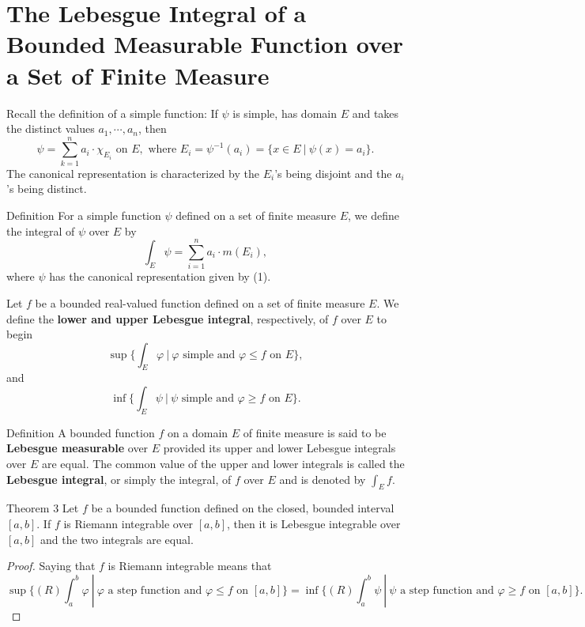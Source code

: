 \section{The Lebesgue Integral of a Bounded Measurable Function over a Set of Finite Measure}
\begin{flushleft}
    Recall the definition of a simple function:
    If $\psi$ is simple, has domain $E$ and takes the distinct values $a_1,\cdots,a_n$, then
    \begin{equation}
        \psi=\sum_{k=1}^n a_i\cdot\chi_{E_i}\text{ on }E,\text{ where }E_i=\psi^{-1}(a_i)=\{x\in E\ |\ \psi(x)=a_i\}.\tag{1}   
    \end{equation}
    The canonical representation is characterized by the $E_i$'s being disjoint and the $a_i$'s being distinct.
    \begin{namedthm*}{Definition}
        For a simple function $\psi$ defined on a set of finite measure $E$, we define the integral of $\psi$ over $E$ by
        \[
            \int_E\psi=\sum_{i=1}^n a_i\cdot m(E_i),
        \]
        where $\psi$ has the canonical representation given by (1).
    \end{namedthm*}
    Let $f$ be a bounded real-valued function defined on a set of finite measure $E$.
    We define the \textbf{lower and upper Lebesgue integral}, respectively, of $f$ over $E$ to begin
    \[
        \sup\biggl\{\int_E\varphi\ |\ \varphi\text{ simple and }\varphi\le f\text{ on }E\biggr\},
    \]
    and
    \[
        \inf\biggl\{\int_E\psi\ |\ \psi\text{ simple and }\varphi\ge f\text{ on }E\biggr\}.
    \]
    \begin{namedthm*}{Definition}
        A bounded function $f$ on a domain $E$ of finite measure is said to be \textbf{Lebesgue measurable} over $E$ provided its upper and lower Lebesgue integrals over $E$ are equal.
        The common value of the upper and lower integrals is called the \textbf{Lebesgue integral}, or simply the integral, of $f$ over $E$ and is denoted by $\int_Ef$.
    \end{namedthm*}
    \begin{namedthm*}{Theorem 3}    
        Let $f$ be a bounded function defined on the closed, bounded interval $[a,b]$.
        If $f$ is Riemann integrable over $[a,b]$, then it is Lebesgue integrable over $[a,b]$ and the two integrals are equal.
    \end{namedthm*}
    \begin{proof}
        Saying that $f$ is Riemann integrable means that
        \[
            \sup\biggl\{(R)\int_a^b\varphi\ |\ \varphi\text{ a step function and }\varphi\le f\text{ on }[a,b]\biggr\}=\inf\biggl\{(R)\int_a^b\psi\ |\ \psi\text{ a step function and }\varphi\ge f\text{ on }[a,b]\biggr\}.
\]
\end{proof}
\end{flushleft}
